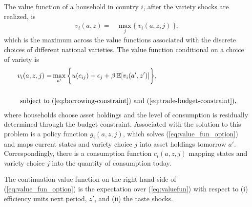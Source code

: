 \documentclass[12pt,pdftex]{article}
\begin{document}
\begin{onehalfspacing}
The value function of a household in country $i$, after the variety shocks are realized, is
\begin{align}
v_{i}(a, z) = &  \max_{j} \big  \{ \  v_{i}(a, z, j)  \ \big \},
\label{eq:valuefun}
\end{align}
which is the maximum across the value functions associated with the discrete choices of different national varieties. The value function conditional on a choice of variety is
\begin{align}
v_{i}(a, z, j) = &  \max_{\ a' \ }\bigg  \{ u(c_{ij}) + \epsilon_{j}  + \beta \, \mathbb{E} [v_{i}(a', z')]  \bigg\},
\label{eq:value_fun_option} \\
\nonumber \\
\mbox{subject to}  \ & (\ref{eq:borrowing-constraint}) \  \mathrm{and} \ (\ref{eq:trade-budget-constraint}), \nonumber
\end{align}
where households choose asset holdings and the level of consumption is residually determined through the budget constraint. Associated with the solution to this problem is a policy function $g_{i}(a,z, j)$, which solves (\ref{eq:value_fun_option}) and maps current states and variety choice $j$ into asset holdings tomorrow $a'$. Correspondingly, there is a consumption function $c_{i}(a,z, j)$ mapping states and variety choice $j$ into the quantity of consumption today.

The continuation value function on the right-hand side of (\ref{eq:value_fun_option}) is the expectation over (\ref{eq:valuefun}) with respect to (i) efficiency units next period, $z'$, and (ii) the taste shocks.


\end{onehalfspacing}
\end{document}
